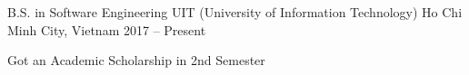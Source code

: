 \begin{cventries}
    \cventry
    {B.S. in Software Engineering}
    {UIT (University of Information Technology)}
    {Ho Chi Minh City, Vietnam}
    {2017 -- Present}
    {
        \begin{cvitems}
            \item {Got an Academic Scholarship in 2nd Semester}
        \end{cvitems}
    }
\end{cventries}
